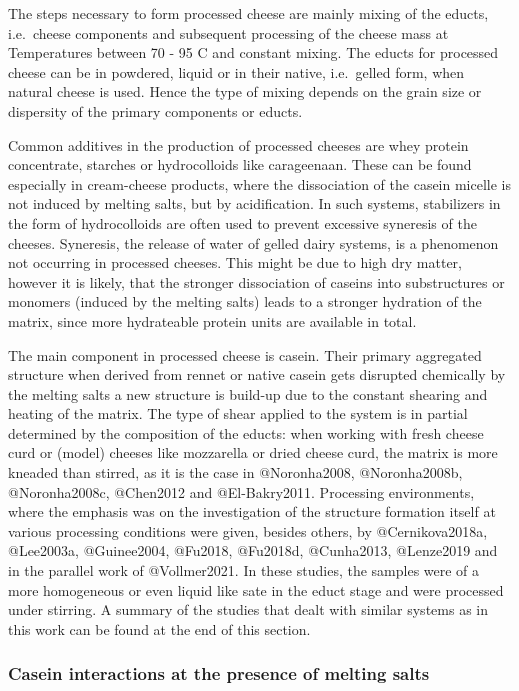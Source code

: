\documentclass[
]{article}
\begin{document}
The steps necessary to form processed cheese are mainly mixing of the
educts, i.e.~cheese components and subsequent processing of the cheese
mass at Temperatures between 70 - 95 C and constant mixing. The educts
for processed cheese can be in powdered, liquid or in their native,
i.e.~gelled form, when natural cheese is used. Hence the type of mixing
depends on the grain size or dispersity of the primary components or
educts.

Common additives in the production of processed cheeses are whey protein
concentrate, starches or hydrocolloids like carageenaan. These can be
found especially in cream-cheese products, where the dissociation of the
casein micelle is not induced by melting salts, but by acidification. In
such systems, stabilizers in the form of hydrocolloids are often used to
prevent excessive syneresis of the cheeses. Syneresis, the release of
water of gelled dairy systems, is a phenomenon not occurring in
processed cheeses. This might be due to high dry matter, however it is
likely, that the stronger dissociation of caseins into substructures or
monomers (induced by the melting salts) leads to a stronger hydration of
the matrix, since more hydrateable protein units are available in total.

The main component in processed cheese is casein. Their primary
aggregated structure when derived from rennet or native casein gets
disrupted chemically by the melting salts a new structure is build-up
due to the constant shearing and heating of the matrix. The type of
shear applied to the system is in partial determined by the composition
of the educts: when working with fresh cheese curd or (model) cheeses
like mozzarella or dried cheese curd, the matrix is more kneaded than
stirred, as it is the case in @Noronha2008, @Noronha2008b,
@Noronha2008c, @Chen2012 and @El-Bakry2011. Processing environments,
where the emphasis was on the investigation of the structure formation
itself at various processing conditions were given, besides others, by
@Cernikova2018a, @Lee2003a, @Guinee2004, @Fu2018, @Fu2018d, @Cunha2013,
@Lenze2019 and in the parallel work of @Vollmer2021. In these studies,
the samples were of a more homogeneous or even liquid like sate in the
educt stage and were processed under stirring. A summary of the studies
that dealt with similar systems as in this work can be found at the end
of this section.

\subsubsection{Casein interactions at the presence of melting salts}
\end{document}
